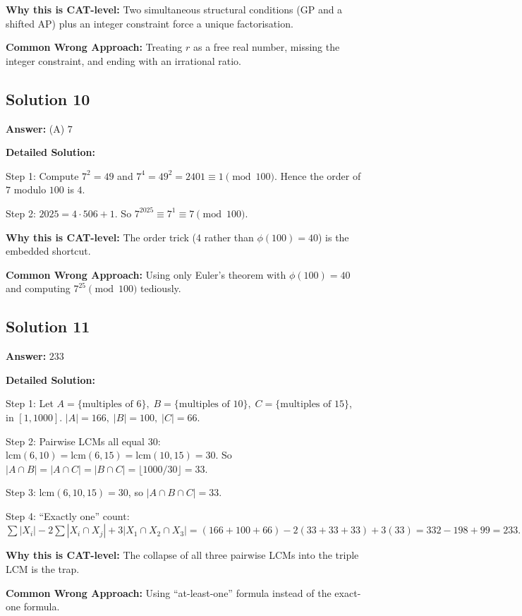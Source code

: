 \documentclass[11pt]{article}
\begin{document}
\textbf{Why this is CAT-level:} Two simultaneous structural conditions (GP and a shifted AP) plus an integer constraint force a unique factorisation.

\textbf{Common Wrong Approach:} Treating \(r\) as a free real number, missing the integer constraint, and ending with an irrational ratio.

\subsection*{Solution 10}

\textbf{Answer:} (A) \(7\)

\textbf{Detailed Solution:}

Step 1: Compute \(7^2 = 49\) and \(7^4 = 49^2 = 2401 \equiv 1 \pmod{100}\). Hence the order of \(7\) modulo \(100\) is \(4\).

Step 2: \(2025 = 4 \cdot 506 + 1\). So \(7^{2025} \equiv 7^1 \equiv 7 \pmod{100}\).

\textbf{Why this is CAT-level:} The order trick (4 rather than \(\phi(100)=40\)) is the embedded shortcut.

\textbf{Common Wrong Approach:} Using only Euler's theorem with \(\phi(100)=40\) and computing \(7^{25} \pmod{100}\) tediously.

\subsection*{Solution 11}

\textbf{Answer:} \(233\)

\textbf{Detailed Solution:}

Step 1: Let \(A=\{\text{multiples of }6\},\; B=\{\text{multiples of }10\},\; C=\{\text{multiples of }15\}\), in \([1,1000]\).
\(|A|=166,\;|B|=100,\;|C|=66.\)

Step 2: Pairwise LCMs all equal \(30\): \(\mathrm{lcm}(6,10)=\mathrm{lcm}(6,15)=\mathrm{lcm}(10,15)=30\).
So \(|A\cap B|=|A\cap C|=|B\cap C|=\lfloor 1000/30\rfloor=33\).

Step 3: \(\mathrm{lcm}(6,10,15)=30\), so \(|A\cap B\cap C|=33\).

Step 4: ``Exactly one'' count: 
\(\sum|X_i| - 2\sum|X_i\cap X_j| + 3|X_1\cap X_2\cap X_3| = (166+100+66) - 2(33+33+33) + 3(33) = 332 - 198 + 99 = 233.\)

\textbf{Why this is CAT-level:} The collapse of all three pairwise LCMs into the triple LCM is the trap.

\textbf{Common Wrong Approach:} Using ``at-least-one'' formula instead of the exact-one formula.
\end{document}
